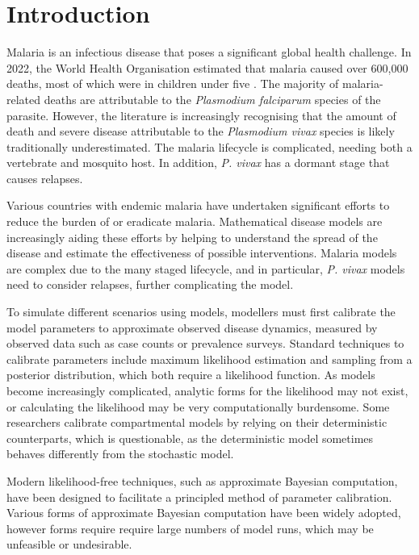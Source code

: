 \chapter{Introduction}

Malaria is an infectious disease that poses a significant global health 
challenge. In 2022, the World Health Organisation estimated that malaria 
caused over 600,000 
deaths, most of which were in children under five 
\parencite{world_health_organization_world_2022}. 
The majority of malaria-related deaths are attributable to the 
\textit{Plasmodium falciparum} species of the parasite. 
However, the literature is increasingly recognising that 
the amount of death and severe disease attributable to the 
\textit{Plasmodium vivax} species is 
likely traditionally underestimated. The malaria lifecycle is complicated, 
needing both a vertebrate and mosquito host. In addition, \textit{P. vivax} has 
a dormant stage that causes relapses. 

Various countries with endemic malaria have undertaken significant efforts to 
reduce the burden of or eradicate malaria. Mathematical disease models are 
increasingly aiding these efforts by helping to understand the spread of the 
disease and estimate the effectiveness of possible interventions. 
Malaria models are complex due to the many staged lifecycle, and in 
particular, \textit{P. vivax} models need to consider relapses, further 
complicating the model.

To simulate different scenarios using models, modellers must first calibrate
the model parameters to approximate observed disease dynamics, measured by
observed data such as case counts or prevalence surveys. Standard techniques
to calibrate parameters include maximum likelihood estimation and sampling
from a posterior distribution, which both require a likelihood function. As
models become increasingly complicated, analytic forms for the likelihood may
not exist, or calculating the likelihood may be very computationally
burdensome. Some researchers calibrate compartmental models by relying on
their deterministic counterparts, which is questionable, as the deterministic
model sometimes behaves differently from the stochastic model.

Modern
likelihood-free techniques, such as approximate Bayesian computation, 
have been designed to
facilitate a principled method of parameter calibration.
Various forms of approximate Bayesian computation have been widely adopted, 
however forms require 
require large numbers of model runs, which may be unfeasible or undesirable.

